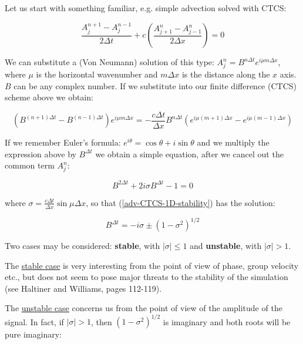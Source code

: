 	Let us start with something familiar, e.g. simple advection solved with CTCS:
	
	\begin{equation}
		\frac {A_j^{n+1}-A_j^{n-1}}{ 2 \Delta t} +c \left(  \frac {A_{j+1}^{n}-A_{j-1}^{n}}{ 2 \Delta x}  \right) = 0
		\label{adv-CTCS-1D}
	\end{equation}
	
	We can substitute a (Von Neumann) solution of this type: ${A_j^{n}=B^{n \Delta t} e^{i \mu m \Delta x}}$, where $\mu$ is the horizontal wavenumber and $m \Delta x$ is the distance along the $x$ axis. $B$ can be any complex number. If we substitute into our finite difference (CTCS) scheme above we obtain:
	
	\begin{equation}
		\left ( B^{(n+1)\Delta t}-B^{(n-1) \Delta t} \right ) e^{i \mu m \Delta x} = - \frac {c \Delta t}{\Delta x} B^{n \Delta t} \left( e^{i \mu (m+1) \Delta x}  - e^{i \mu (m-1) \Delta x}  \right)
		\label{adv-CTCS-1D-solution}
	\end{equation}
	
	If we remember Euler's formula: $e^{i \theta}=\cos \theta +i \sin \theta$ and we multiply the expression above by $B^{\Delta t}$ we obtain a simple equation, after we cancel out the common term $A_j^{n}$:
	
	\begin{equation}
		B^{2 \Delta t}    + 2 i \sigma B^{\Delta t}  -1 = 0  
		\label{adv-CTCS-1D-stability}
	\end{equation}
	
	where $\sigma = \frac {c \Delta t}{\Delta x} \sin \mu \Delta x$, so that (\ref{adv-CTCS-1D-stability}) has the solution:
	
	\begin{equation}
		B^{\Delta t} = -i \sigma \pm \left( 1 - \sigma^2 \right)^{1/2} 
		\label{adv-CTCS-1D-eigenvalues}
	\end{equation}
	

	Two cases may be considered: \textbf{stable}, with $|\sigma| \leq 1$ and \textbf{unstable}, with $|\sigma| > 1$.
	\medskip
	
	The \underline{stable case} is very interesting from the point of view of phase, group velocity etc., but does not seem to pose major threats to the stability of the simulation (see Haltiner and Williams, pages 112-119).
	
	\medskip
	The \underline{unstable case} concerns us from the point of view of the amplitude of the signal. In fact, if $|\sigma| > 1$, then $\left( 1 - \sigma^2 \right)^{1/2}$ is imaginary and both roots will be pure imaginary:
	
